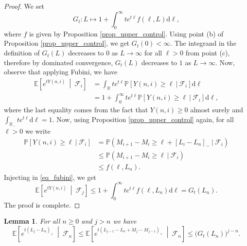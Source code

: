 \documentclass[a4paper, 11pt]{article}
\theoremstyle{plain}
\newtheorem{Lemma}[Theorem]{Lemma}
\theoremstyle{definition}
\newcommand{\E}{\mathbb{E}}
\newcommand{\R}{\mathbb{R}}
\renewcommand{\P}{\mathbb{P}}
\numberwithin{equation}{section}
\begin{document}
\begin{proof}
    We set
        \[G_t:L\mapsto 1+\int_0^\infty te^{t\ell}f(\ell, L)\mathrm d\ell,\]
    where $f$ is given by Proposition \ref{prop_upper_control}. Using point (b) of Proposition \ref{prop_upper_control}, we get $G_t(0)<\infty$. The integrand in the definition of $G_t(L)$ decreases to $0$ as $L\rightarrow\infty$ for all $\ell>0$ from point (c), therefore by dominated convergence, $G_t(L)$ decreases to $1$ as $L\rightarrow\infty$. Now, observe that applying Fubini, we have
    \begin{equation}
        \label{eq_fubini}
        \begin{split}
            \E\left[e^{tY(n, i)}~\middle\vert~\mathcal F_i\right]&=\int_\R te^{t\ell}\P[Y(n, i)\geq \ell~\vert~\mathcal F_i]\mathrm d\ell\\
            &=1+\int_0^\infty te^{t\ell}\P[Y(n, i)\geq \ell~\vert~\mathcal F_i]\mathrm d\ell,
        \end{split}
    \end{equation}
    where the last equality comes from the fact that $Y(n, i)\geq 0$ almost surely and $\int_{\R_-}te^{t\ell}\mathrm d\ell=1$. Now, using Proposition \ref{prop_upper_control} again, for all $\ell>0$ we write
    \begin{equation*}
        \begin{split}
            \P[Y(n, i)\geq \ell~\vert~\mathcal F_i]&=\P(M_{i+1}-M_i\geq \ell+[L_i-L_n]_-~\vert~\mathcal F_i)\\
            &\leq\P(M_{i+1}-M_i\geq \ell~\vert~\mathcal F_i)\\
            &\leq f(\ell, L_n).
        \end{split}
    \end{equation*}
    Injecting in \eqref{eq_fubini}, we get
        \[\E\left[e^{tY(n, i)}~\middle\vert~\mathcal F_j\right]\leq 1+\int_0^\infty te^{t\ell}f(\ell, L_n)\mathrm d\ell=G_t(L_n).\]
    The proof is complete.
\end{proof}




\begin{Lemma}
    \label{lemma_upper_moment}
    For all $n\geq0$ and $j>n$ we have
        \[\E\left[e^{t(L_j-L_n)_+}~\middle\vert~\mathcal F_n\right]\leq\E\left[e^{t(L_{j-1}-L_n+M_j-M_{j-1})_+}~\middle\vert~\mathcal F_n\right]\leq \big(G_t(L_n)\big)^{j-n}.\]
\end{Lemma}
\end{document}
